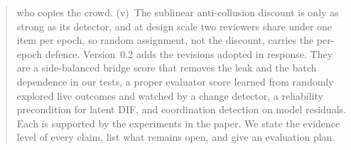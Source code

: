 \documentclass[11pt,a4paper]{article}
\begin{document}
\begin{abstract}
who copies the crowd.
(v)~The sublinear anti-collusion discount is only as strong as its detector, and at design
scale two reviewers share under one item per epoch, so random assignment, not the discount,
carries the per-epoch defence.
Version~0.2 adds the revisions adopted in response. They are a side-balanced bridge score that
removes the leak and the batch dependence in our tests, a proper evaluator score learned from
randomly explored live outcomes and watched by a change detector, a reliability precondition
for latent DIF, and coordination detection on model residuals. Each is supported by the
experiments in the paper.
We state the evidence level of every claim, list what remains open, and give an evaluation plan.
\end{abstract}

\tableofcontents
\clearpage

















\appendix



\end{document}
